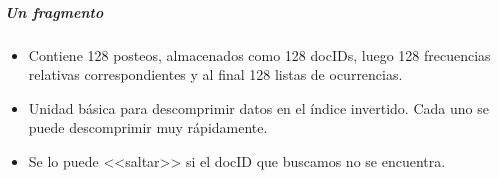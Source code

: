 \subparagraph{Un fragmento}

\begin{itemize}

\item Contiene 128 posteos, almacenados como 128 docIDs, luego 128 frecuencias relativas correspondientes y al final 128 listas de ocurrencias.

\item Unidad básica para descomprimir datos en el índice invertido. Cada uno se puede descomprimir muy rápidamente.

\item Se lo puede <<saltar>> si el docID que buscamos no se encuentra.

\end{itemize}


